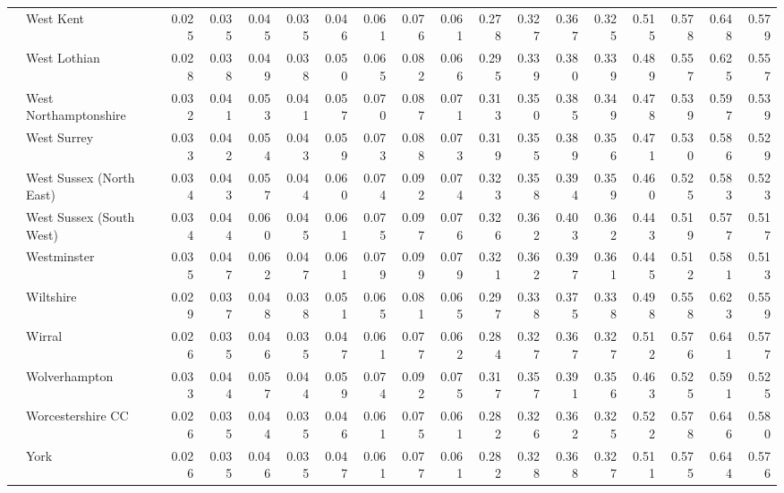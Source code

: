 \begin{tabular}{llrrrrrrrrrrrrrrrr}
 & West Kent & 0.025 & 0.035 & 0.045 & 0.035 & 0.046 & 0.061 & 0.076 & 0.061 & 0.278 & 0.327 & 0.367 & 0.325 & 0.515 & 0.578 & 0.648 & 0.579 \\
 & West Lothian & 0.028 & 0.038 & 0.049 & 0.038 & 0.050 & 0.065 & 0.082 & 0.066 & 0.295 & 0.339 & 0.380 & 0.339 & 0.489 & 0.557 & 0.625 & 0.557 \\
 & West Northamptonshire & 0.032 & 0.041 & 0.053 & 0.041 & 0.057 & 0.070 & 0.087 & 0.071 & 0.313 & 0.350 & 0.385 & 0.349 & 0.478 & 0.539 & 0.597 & 0.539 \\
 & West Surrey & 0.033 & 0.042 & 0.054 & 0.043 & 0.059 & 0.073 & 0.088 & 0.073 & 0.319 & 0.355 & 0.389 & 0.356 & 0.471 & 0.530 & 0.586 & 0.529 \\
 & West Sussex (North East) & 0.034 & 0.043 & 0.057 & 0.044 & 0.060 & 0.074 & 0.092 & 0.074 & 0.323 & 0.358 & 0.394 & 0.359 & 0.460 & 0.525 & 0.583 & 0.523 \\
 & West Sussex (South West) & 0.034 & 0.044 & 0.060 & 0.045 & 0.061 & 0.075 & 0.097 & 0.076 & 0.326 & 0.362 & 0.403 & 0.362 & 0.443 & 0.519 & 0.577 & 0.517 \\
 & Westminster & 0.035 & 0.047 & 0.062 & 0.047 & 0.061 & 0.079 & 0.099 & 0.079 & 0.321 & 0.362 & 0.397 & 0.361 & 0.445 & 0.512 & 0.581 & 0.513 \\
 & Wiltshire & 0.029 & 0.037 & 0.048 & 0.038 & 0.051 & 0.065 & 0.081 & 0.065 & 0.297 & 0.338 & 0.375 & 0.338 & 0.498 & 0.558 & 0.623 & 0.559 \\
 & Wirral & 0.026 & 0.035 & 0.046 & 0.035 & 0.047 & 0.061 & 0.077 & 0.062 & 0.284 & 0.327 & 0.367 & 0.327 & 0.512 & 0.576 & 0.641 & 0.577 \\
 & Wolverhampton & 0.033 & 0.044 & 0.057 & 0.044 & 0.059 & 0.074 & 0.092 & 0.075 & 0.317 & 0.357 & 0.391 & 0.356 & 0.463 & 0.525 & 0.591 & 0.525 \\
 & Worcestershire CC & 0.026 & 0.035 & 0.044 & 0.035 & 0.046 & 0.061 & 0.075 & 0.061 & 0.282 & 0.326 & 0.362 & 0.325 & 0.522 & 0.578 & 0.646 & 0.580 \\
 & York & 0.026 & 0.035 & 0.046 & 0.035 & 0.047 & 0.061 & 0.077 & 0.061 & 0.282 & 0.328 & 0.368 & 0.327 & 0.511 & 0.575 & 0.644 & 0.576 \\
\cline{1-18}
\bottomrule
\end{tabular}

